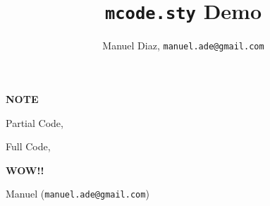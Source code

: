 \documentclass{article}
\title{\texttt{mcode.sty} Demo}
\author{Manuel Diaz, \texttt{manuel.ade@gmail.com}}
\begin{document}
\maketitle

\textbf{NOTE}

Partial Code,


Full Code,


\medskip

\textbf{WOW!!} 

\medskip

Manuel (\texttt{manuel.ade@gmail.com})
\end{document}
